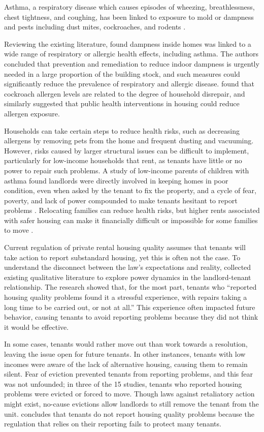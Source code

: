 \documentclass[
]{book}
\begin{document}
Asthma, a respiratory disease which causes episodes of wheezing, breathlessness, chest tightness, and coughing, has been linked to exposure to mold or dampness and pests including dust mites, cockroaches, and rodents \citep[ 63]{cdc2006}.

Reviewing the existing literature, \citet{mendell2011} found dampness inside homes was linked to a wide range of respiratory or allergic health effects, including asthma. The authors concluded that prevention and remediation to reduce indoor dampness is urgently needed in a large proportion of the building stock, and such measures could significantly reduce the prevalence of respiratory and allergic disease. \citet{rauh2002} found that cockroach allergen levels are related to the degree of household disrepair, and similarly suggested that public health interventions in housing could reduce allergen exposure.

Households can take certain steps to reduce health risks, such as decreasing allergens by removing pets from the home and frequent dusting and vacuuming. However, risks caused by larger structural issues can be difficult to implement, particularly for low-income households that rent, as tenants have little or no power to repair such problems. A study of low-income parents of children with asthma found landlords were directly involved in keeping homes in poor condition, even when asked by the tenant to fix the property, and a cycle of fear, poverty, and lack of power compounded to make tenants hesitant to report problems \citep{grineski2010}. Relocating families can reduce health risks, but higher rents associated with safer housing can make it financially difficult or impossible for some families to move \citep{mclaine2006}.

Current regulation of private rental housing quality assumes that tenants will take action to report substandard housing, yet this is often not the case. To understand the disconnect between the law's expectations and reality, \citet{chisholm2018} collected existing qualitative literature to explore power dynamics in the landlord-tenant relationship. The research showed that, for the most part, tenants who ``reported housing quality problems found it a stressful experience, with repairs taking a long time to be carried out, or not at all.'' This experience often impacted future behavior, causing tenants to avoid reporting problems because they did not think it would be effective.

In some cases, tenants would rather move out than work towards a resolution, leaving the issue open for future tenants. In other instances, tenants with low incomes were aware of the lack of alternative housing, causing them to remain silent. Fear of eviction prevented tenants from reporting problems, and this fear was not unfounded; in three of the 15 studies, tenants who reported housing problems were evicted or forced to move. Though laws against retaliatory action might exist, no-cause evictions allow landlords to still remove the tenant from the unit. \citet{chisholm2018} concludes that tenants do not report housing quality problems because the regulation that relies on their reporting fails to protect many tenants.
\end{document}

